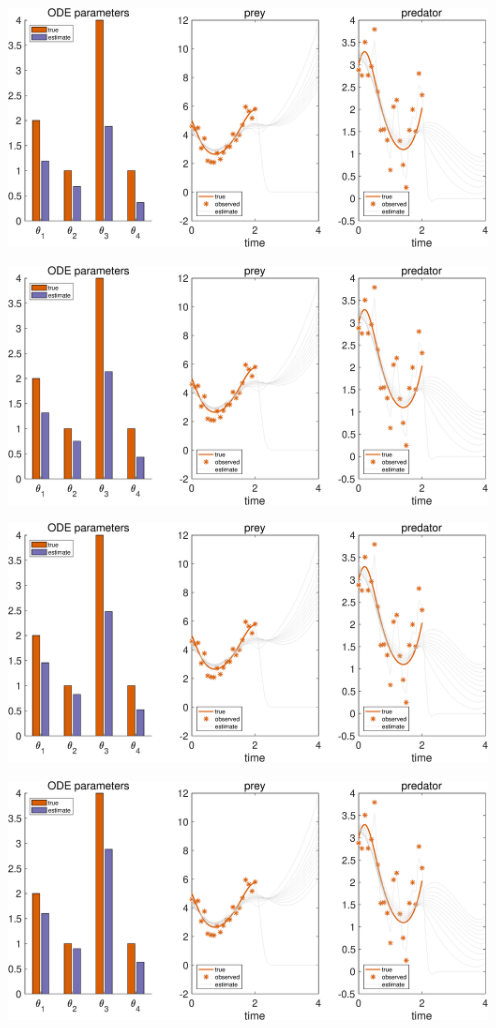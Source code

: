 {\includegraphics [width=5in]{Lotka_Volterra_3_13.eps}

\includegraphics [width=5in]{Lotka_Volterra_3_14.eps}

\includegraphics [width=5in]{Lotka_Volterra_3_15.eps}

\includegraphics [width=5in]{Lotka_Volterra_3_16.eps}

}
